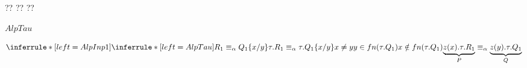  ?? ?? ??
 
 		\begin{description}
 		  \item[$AlpTau$]
 		\end{description}
 		\[\inferrule*[left=AlpInp1]{
 		    \inferrule* [left=AlpTau]{
 		      R_{1}\equiv_{\alpha} Q_{1}\{x/y\}
 		    }{
 		      \tau.R_{1}\equiv_{\alpha} \tau.Q_{1}\{x/y\}
 		    }
 		  \\
 		    x\neq y	   
 		  \\
 		    y \in fn(\tau.Q_{1})
 		  \\
 		    x \notin fn(\tau.Q_{1})
 		}{
 		  \underbrace{z(x).\tau.R_{1}}_{P}
 		    \equiv_{\alpha}
 		      \underbrace{z(y).\tau.Q_{1}}_{Q}
 		}\]
 		
 

